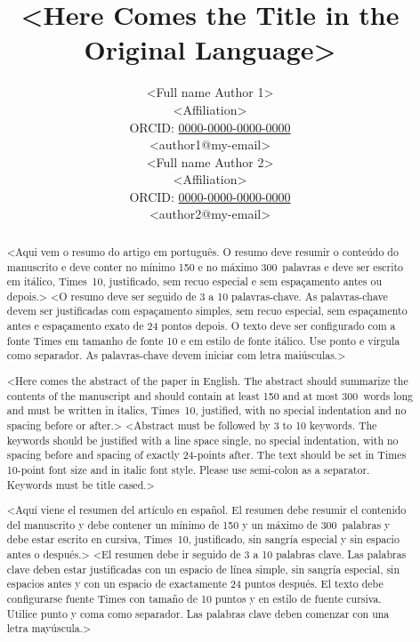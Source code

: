 \documentclass[english, spanish, brazilian]{RBIEarticle} %
\title{<Here Comes the Title in the Original Language>}
\author{%
	\parbox{8cm}{%
		<Full name Author 1>\\
		<Affiliation>\\
		ORCID: \href{https://orcid.org/0000-0000-0000-0000}{0000-0000-0000-0000}\\
		<author1@my-email>
	}
	\parbox{8cm}{%
		<Full name Author 2>\\
		<Affiliation>\\
		ORCID: \href{https://orcid.org/0000-0000-0000-0000}{0000-0000-0000-0000}\\
		<author2@my-email>
	}
}
\begin{document}
\maketitle

\begin{otherlanguage}{brazilian}
\begin{abstract}
<Aqui vem o resumo do artigo em português. O resumo deve resumir o conteúdo do manuscrito e deve conter no mínimo 150 e no máximo 300~palavras e deve ser escrito em itálico, Times~10, justificado, sem recuo especial e sem espaçamento antes ou depois.>
\keywords <O resumo deve ser seguido de 3 a 10 palavras-chave. As palavras-chave devem ser justificadas com espaçamento simples, sem recuo especial, sem espaçamento antes e espaçamento exato de 24 pontos depois. O texto deve ser configurado com a fonte Times em tamanho de fonte 10 e em estilo de fonte itálico. Use ponto e vírgula como separador. As palavras-chave devem iniciar com letra maiúsculas.>
\end{abstract}
\end{otherlanguage}

\begin{otherlanguage}{english}
\begin{abstract}
<Here comes the abstract of the paper in English. The abstract should summarize the contents of the manuscript and should contain at least 150 and at most 300~words long and must be written in italics, Times~10, justified, with no special indentation and no spacing before or after.>
\keywords <Abstract must be followed by 3 to 10 keywords. The keywords should be justified with a line space single, no special indentation, with no spacing before and spacing of exactly 24-points after. The text should be set in Times 10-point font size and in italic font style. Please use semi-colon as a separator. Keywords must be title cased.>
\end{abstract}
\end{otherlanguage}

\begin{otherlanguage}{spanish}
\begin{abstract}
<Aquí viene el resumen del artículo en español. El resumen debe resumir el contenido del manuscrito y debe contener un mínimo de 150 y un máximo de 300~palabras y debe estar escrito en cursiva, Times~10, justificado, sin sangría especial y sin espacio antes o después.>
\keywords <El resumen debe ir seguido de 3 a 10 palabras clave. Las palabras clave deben estar justificadas con un espacio de línea simple, sin sangría especial, sin espacios antes y con un espacio de exactamente 24 puntos después. El texto debe configurarse fuente Times con tamaño de 10 puntos y en estilo de fuente cursiva. Utilice punto y coma como separador. Las palabras clave deben comenzar con una letra mayúscula.>
\end{abstract}
\end{otherlanguage}
\end{document}
